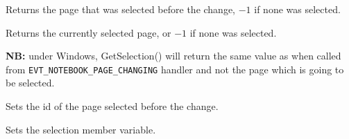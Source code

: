 
Returns the page that was selected before the change, $-1$ if none was selected.

\label{wxnotebookeventgetselection}


Returns the currently selected page, or $-1$ if none was selected.

{\bf NB:} under Windows, GetSelection() will return the same value as\rtfsp
{} when called from
{\tt EVT\_NOTEBOOK\_PAGE\_CHANGING} handler and not the page which is going to
be selected.

\label{wxnotebookeventsetoldselection}


Sets the id of the page selected before the change.

\label{wxnotebookeventsetselection}


Sets the selection member variable.





